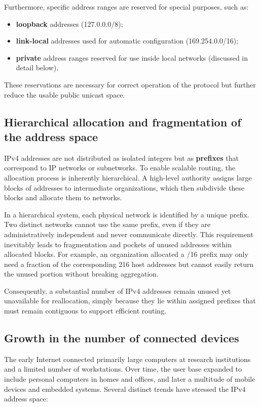 Furthermore, specific address ranges are reserved for special purposes, such as:

\begin{itemize}
\item \textbf{loopback} addresses (127.0.0.0/8);
\item \textbf{link-local} addresses used for automatic configuration (169.254.0.0/16);
\item \textbf{private} address ranges reserved for use inside local networks (discussed in detail below).
\end{itemize}

These reservations are necessary for correct operation of the protocol but further reduce the usable public unicast space.

\subsection{Hierarchical allocation and fragmentation of the address space}

IPv4 addresses are not distributed as isolated integers but as \textbf{prefixes} that correspond to IP networks or subnetworks. To enable scalable routing, the allocation process is inherently hierarchical. A high-level authority assigns large blocks of addresses to intermediate organizations, which then subdivide these blocks and allocate them to networks.

In a hierarchical system, each physical network is identified by a unique prefix. Two distinct networks cannot use the same prefix, even if they are administratively independent and never communicate directly. This requirement inevitably leads to fragmentation and pockets of unused addresses within allocated blocks. For example, an organization allocated a /16 prefix may only need a fraction of the corresponding 216 host addresses but cannot easily return the unused portion without breaking aggregation.

Consequently, a substantial number of IPv4 addresses remain unused yet unavailable for reallocation, simply because they lie within assigned prefixes that must remain contiguous to support efficient routing.

\subsection{Growth in the number of connected devices}

The early Internet connected primarily large computers at research institutions and a limited number of workstations. Over time, the user base expanded to include personal computers in homes and offices, and later a multitude of mobile devices and embedded systems. Several distinct trends have stressed the IPv4 address space:

